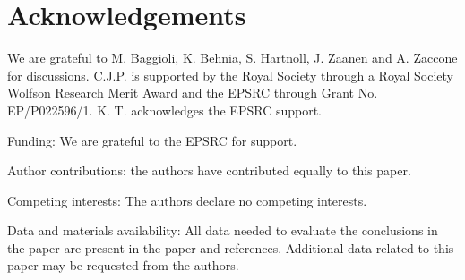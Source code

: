 \documentclass[aps,prl,groupedaddress,fleqn,twocolumn,10pt]{revtex4}
\begin{document}
\section{Acknowledgements}

We are grateful to M. Baggioli, K. Behnia, S. Hartnoll, J. Zaanen and A. Zaccone for discussions. C.J.P. is supported by the Royal Society through a Royal Society Wolfson Research Merit Award and the EPSRC through Grant No. EP/P022596/1. K. T. acknowledges the EPSRC support.

Funding: We are grateful to the EPSRC for support.

Author contributions: the authors have contributed equally to this paper.

Competing interests: The authors declare no competing interests.

Data and materials availability: All data needed to evaluate the conclusions in the paper are present in the paper and references. Additional data related to this paper may be requested from the authors.
\end{document}
